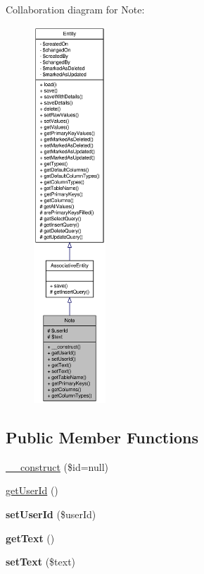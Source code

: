 Collaboration diagram for Note:\nopagebreak
\begin{figure}[H]
\begin{center}
\leavevmode
\includegraphics[height=400pt]{classNote__coll__graph}
\end{center}
\end{figure}
\subsection*{Public Member Functions}
\begin{DoxyCompactItemize}
\item 
\hyperlink{classNote_ae60466bb5611822f5fa13ca5ee45af8c}{\_\-\_\-construct} (\$id=null)
\item 
\hyperlink{classNote_ad2e8b55360b22ba5ac67819cc2661804}{getUserId} ()
\item 
\hypertarget{classNote_a5b1e254c6edc00b324142fd66cc4b286}{
{\bfseries setUserId} (\$userId)}
\label{classNote_a5b1e254c6edc00b324142fd66cc4b286}

\item 
\hypertarget{classNote_a849b7537b5b6a6b94758169962b94c1a}{
{\bfseries getText} ()}
\label{classNote_a849b7537b5b6a6b94758169962b94c1a}

\item 
\hypertarget{classNote_a795ea371b66cfd09b4f94a6c72e041ee}{
{\bfseries setText} (\$text)}
\label{classNote_a795ea371b66cfd09b4f94a6c72e041ee}

\end{DoxyCompactItemize}
